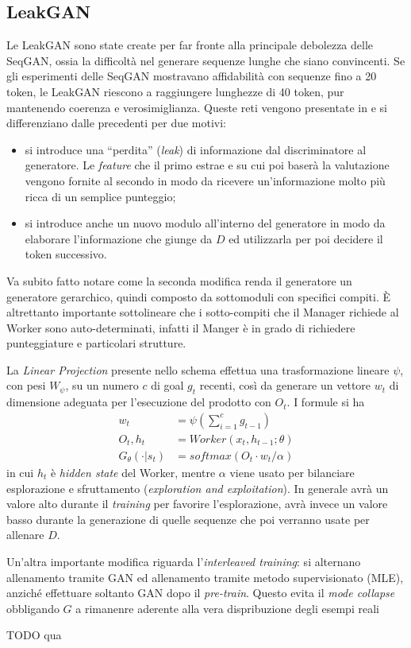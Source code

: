 \subsection{LeakGAN}
Le LeakGAN sono state create per far fronte alla principale debolezza delle SeqGAN, ossia la difficoltà nel generare sequenze lunghe che siano convincenti.
Se gli esperimenti delle SeqGAN mostravano affidabilità con sequenze fino a 20 token, le LeakGAN riescono a raggiungere lunghezze di 40 token, pur mantenendo coerenza e verosimiglianza.
Queste reti vengono presentate in \cite{LeakGAN} e si differenziano dalle precedenti per due motivi:
\begin{itemize}
  \item si introduce una ``perdita'' (\emph{leak}) di informazione dal discriminatore al generatore.
    Le \emph{feature} che il primo estrae e su cui poi baserà la valutazione vengono fornite al secondo in modo da ricevere un'informazione molto più ricca di un semplice punteggio; 
  \item si introduce anche un nuovo modulo all'interno del generatore in modo da elaborare l'informazione che giunge da $D$ ed utilizzarla per poi decidere il token successivo.
\end{itemize}


Va subito fatto notare come la seconda modifica renda il generatore un generatore gerarchico, quindi composto da sottomoduli con specifici compiti.
È altrettanto importante sottolineare che i sotto-compiti che il Manager richiede al Worker sono auto-determinati, infatti il Manger è in grado di richiedere punteggiature e particolari strutture.

La \emph{Linear Projection} presente nello schema effettua una trasformazione lineare $\psi$, con pesi $W_\psi$, su un numero $c$ di goal $g_t$ recenti, così da generare un vettore $w_t$ di dimensione adeguata per l'esecuzione del prodotto con $O_t$.
I formule si ha
\begin{align}
  w_t &= \psi \left( \sum_{i=1}^{c} g_{t-1} \right)
  \\
  O_t, h_t &= Worker(x_t, h_{t-1}; \theta)
  \\
  G_\theta(\cdot|s_t) &= softmax ( O_t \cdot w_t / \alpha)
\end{align}
in cui $h_t$ è \emph{hidden state} del Worker, mentre $\alpha$ viene usato per bilanciare esplorazione e sfruttamento (\emph{exploration and exploitation}).
In generale avrà un valore alto durante il \emph{training} per favorire l'esplorazione, avrà invece un valore basso durante la generazione di quelle sequenze che poi verranno usate per allenare $D$.



Un'altra importante modifica riguarda l'\emph{interleaved training}: si alternano allenamento tramite GAN ed allenamento tramite metodo supervisionato (MLE), anziché effettuare soltanto GAN dopo il \emph{pre-train}.
Questo evita il \emph{mode collapse} obbligando $G$ a rimanenre aderente alla vera dispribuzione degli esempi reali 

TODO qua


